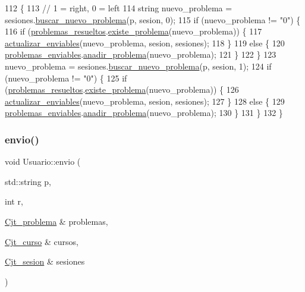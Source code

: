 \begin{DoxyCode}
112                                                                                 \{
113   \textcolor{comment}{// 1 = right, 0 = left}
114   \textcolor{keywordtype}{string} nuevo\_problema = sesiones.\mbox{\hyperlink{class_cjt__sesion_a4aef15fb48b0465b864eaebeb3808cd0}{buscar\_nuevo\_problema}}(p, sesion, 0);
115   \textcolor{keywordflow}{if} (nuevo\_problema != \textcolor{stringliteral}{"0"}) \{
116     \textcolor{keywordflow}{if} (\mbox{\hyperlink{class_usuario_a53fa260ffc780dd5c3a4805d683e5ee7}{problemas\_resueltos}}.\mbox{\hyperlink{class_cjt__problema_a831be5b51e252520ee981b58d9ec00e9}{existe\_problema}}(nuevo\_problema)) \{
117       \mbox{\hyperlink{class_usuario_a4dbe4aafe7c5308293ef5f6094f35bb1}{actualizar\_enviables}}(nuevo\_problema, sesion, sesiones);
118     \}
119     \textcolor{keywordflow}{else} \{
120       \mbox{\hyperlink{class_usuario_a553cef1aad192b30d010cd524f261c1b}{problemas\_enviables}}.\mbox{\hyperlink{class_cjt__problema_a6086147f5615c1cf42d6d563682b080d}{anadir\_problema}}(nuevo\_problema);
121     \}
122   \}
123   nuevo\_problema = sesiones.\mbox{\hyperlink{class_cjt__sesion_a4aef15fb48b0465b864eaebeb3808cd0}{buscar\_nuevo\_problema}}(p, sesion, 1);
124   \textcolor{keywordflow}{if} (nuevo\_problema != \textcolor{stringliteral}{"0"}) \{
125     \textcolor{keywordflow}{if} (\mbox{\hyperlink{class_usuario_a53fa260ffc780dd5c3a4805d683e5ee7}{problemas\_resueltos}}.\mbox{\hyperlink{class_cjt__problema_a831be5b51e252520ee981b58d9ec00e9}{existe\_problema}}(nuevo\_problema)) \{
126       \mbox{\hyperlink{class_usuario_a4dbe4aafe7c5308293ef5f6094f35bb1}{actualizar\_enviables}}(nuevo\_problema, sesion, sesiones);
127     \}
128     \textcolor{keywordflow}{else} \{
129       \mbox{\hyperlink{class_usuario_a553cef1aad192b30d010cd524f261c1b}{problemas\_enviables}}.\mbox{\hyperlink{class_cjt__problema_a6086147f5615c1cf42d6d563682b080d}{anadir\_problema}}(nuevo\_problema);
130     \}
131   \}
132 \}
\end{DoxyCode}
\mbox{\label{class_usuario_a2baa098a110a9041c66bf76635d4153b}} 
\subsubsection{\texorpdfstring{envio()}{envio()}}
{\footnotesize\ttfamily void Usuario\+::envio (\begin{DoxyParamCaption}\item[{std\+::string}]{p,  }\item[{int}]{r,  }\item[{\mbox{\hyperlink{class_cjt__problema}{Cjt\+\_\+problema}} \&}]{problemas,  }\item[{\mbox{\hyperlink{class_cjt__curso}{Cjt\+\_\+curso}} \&}]{cursos,  }\item[{\mbox{\hyperlink{class_cjt__sesion}{Cjt\+\_\+sesion}} \&}]{sesiones }\end{DoxyParamCaption})}



